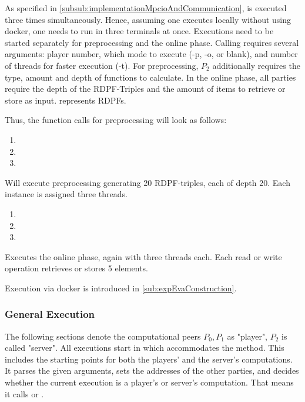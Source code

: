 As specified in \ref{subsub:implementationMpcioAndCommunication},  is executed three times simultaneously.
Hence, assuming one executes locally without using docker, one needs to run  in three terminals at once.
Executions need to be started separately for preprocessing and the online phase.
Calling  requires several arguments: player number, which mode to execute (-p, -o, or blank), and number of threads for faster execution (-t).
For preprocessing, $P_2$ additionally requires the type, amount and depth of functions to calculate.
In the online phase, all parties require the depth of the RDPF-Triples and the amount of items to retrieve or store as input.
 represents RDPFs.

Thus, the function calls for preprocessing will look as follows:
\begin{enumerate}
    \item {}
    \item {}
    \item {}
\end{enumerate}
Will execute preprocessing generating 20 RDPF-triples, each of depth 20.
Each instance is assigned three threads.

\begin{enumerate}
    \item {}
    \item {}
    \item {}
\end{enumerate}
Executes the online phase, again with three threads each.
Each read or write operation retrieves or stores 5 elements.

Execution via docker is introduced in \ref{sub:expEvaConstruction}.

\subsubsection*{General Execution}
The following sections denote the computational peers $P_0,P_1$ as "player", $P_2$ is called "server".
All executions start in  which accommodates the  method.
This includes the starting points for both the players' and the server's computations.
It parses the given arguments, sets the addresses of the other parties, and decides whether the current execution is a player's or server's computation.
That means it calls  or .


